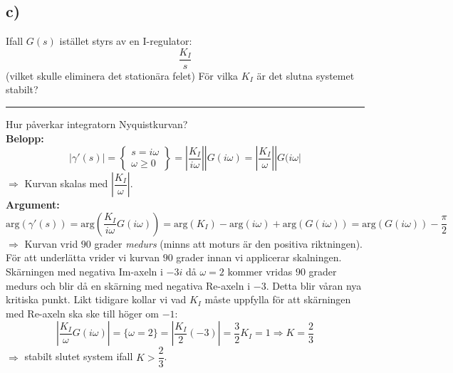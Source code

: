\documentclass[12pt]{article}
\newcommand{\qline}{\hrule \vspace*{10pt}}
\begin{document}
\subsection*{c)}
Ifall $G(s)$ istället styrs av en I-regulator:
\[\frac{K_I}{s}\]
(vilket skulle eliminera det stationära felet) För vilka $K_I$ är det slutna systemet stabilt?\vspace*{5pt}
\qline
Hur påverkar integratorn Nyquistkurvan?\\

\textbf{Belopp:}
\[|\gamma'(s)| =
\begin{Bmatrix}
  s = i\omega \\
  \omega \geq 0
\end{Bmatrix}
= 
\left|
  \frac{K_I}{i\omega}
\right| |G(i\omega) = 
\left|
  \frac{K_I}{\omega}
\right||G(i\omega|\]
$\Rightarrow$ Kurvan skalas med $
\left|
  \dfrac{K_I}{\omega}
\right|$.\\

\textbf{Argument:}
\[\mathrm{arg}(\gamma'(s)) = \mathrm{arg}
\left(
  \frac{K_I}{i\omega}G(i\omega)
\right) = \mathrm{arg}(K_I) - \mathrm{arg}(i\omega) + \mathrm{arg}(G(i\omega)) = \mathrm{arg}(G(i\omega)) - \frac{\pi}{2}
\]
$\Rightarrow$ Kurvan vrid $90$ grader \emph{medurs} (minns att moturs är den positiva riktningen). För att underlätta vrider vi kurvan $90$ grader innan vi applicerar skalningen. Skärningen med negativa Im-axeln i $-3i$ då $\omega = 2$ kommer vridas $90$ grader medurs och blir då en skärning med negativa Re-axeln i $-3$. Detta blir våran nya kritiska punkt. Likt tidigare kollar vi vad $K_I$ måste uppfylla för att skärningen med Re-axeln ska ske till höger om $-1$:
\[
\left|
  \frac{K_I}{\omega}G(i\omega)
\right| = \lbrace \omega = 2 \rbrace = 
\left|
  \frac{K_I}{2} (-3)
\right| = \frac{3}{2}K_I = 1 \Rightarrow K = \frac{2}{3}\]
$\Rightarrow$ stabilt slutet system ifall $K > \dfrac{2}{3}$.
\end{document}
